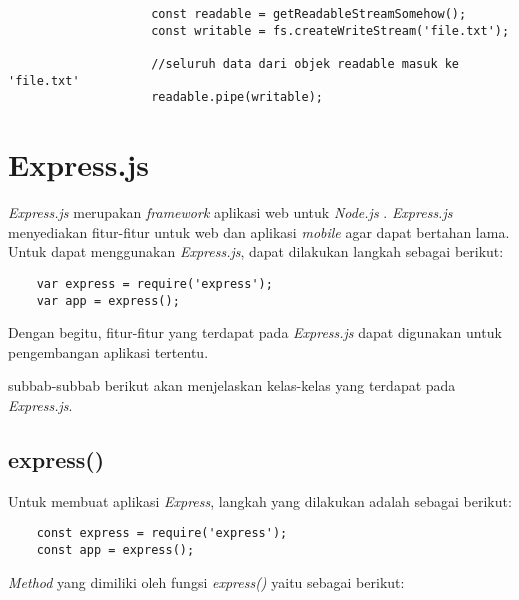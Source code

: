 \begin{enumerate}
\begin{itemize}
\begin{itemize}
\begin{lstlisting}
					const readable = getReadableStreamSomehow();
					const writable = fs.createWriteStream('file.txt');
					
					//seluruh data dari objek readable masuk ke 'file.txt'
					readable.pipe(writable); 
				\end{lstlisting}
				
			\end{itemize}
	\end{itemize}
\end{enumerate}


\section{Express.js}
\label{sec:Express.js}

\textit{Express.js} merupakan \textit{framework} aplikasi web untuk \textit{Node.js} \cite{expressjs}. \textit{Express.js} menyediakan fitur-fitur untuk web dan aplikasi \textit{mobile} agar dapat bertahan lama. Untuk dapat menggunakan \textit{Express.js}, dapat dilakukan langkah sebagai berikut: 
\begin{lstlisting}
	var express = require('express');
	var app = express();
\end{lstlisting}

Dengan begitu, fitur-fitur yang terdapat pada \textit{Express.js} dapat digunakan untuk pengembangan aplikasi tertentu.

subbab-subbab berikut akan menjelaskan kelas-kelas yang terdapat pada \textit{Express.js}.

\subsection{express()}
Untuk membuat aplikasi \textit{Express}, langkah yang dilakukan adalah sebagai berikut:
\begin{lstlisting}
	const express = require('express');
	const app = express();
\end{lstlisting}

\textit{Method} yang dimiliki oleh fungsi \textit{express()} yaitu sebagai berikut:

